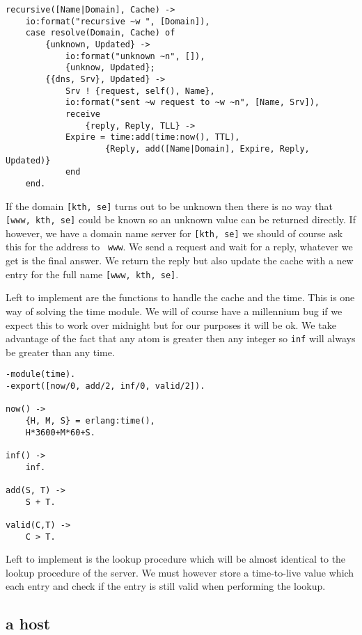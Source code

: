 \documentclass[a4paper, 11pt]{article}
\begin{document}
\begin{verbatim}
recursive([Name|Domain], Cache) ->
    io:format("recursive ~w ", [Domain]),
    case resolve(Domain, Cache) of    
        {unknown, Updated} ->
            io:format("unknown ~n", []),
            {unknow, Updated};
        {{dns, Srv}, Updated} ->
            Srv ! {request, self(), Name},
            io:format("sent ~w request to ~w ~n", [Name, Srv]),
            receive 
                {reply, Reply, TLL} ->
		    Expire = time:add(time:now(), TTL),
                    {Reply, add([Name|Domain], Expire, Reply, Updated)}
            end
    end.
\end{verbatim}

If the domain {\tt [kth, se]} turns out to be unknown then there is no
way that {\tt [www, kth, se]} could be known so an unknown value can
be returned directly. If however, we have a domain name server for
{\tt [kth, se]} we should of course ask this for the address to {\tt
www}. We send a request and wait for a reply, whatever we get is the
final answer. We return the reply but also update the cache with a new
entry for the full name {\tt [www, kth, se]}. 

Left to implement are the functions to handle the cache and the
time. This is one way of solving the time module. We will of course
have a millennium bug if we expect this to work over midnight but for
our purposes it will be ok. We take advantage of the fact that any
atom is greater then any integer so {\tt inf} will always be greater
than any time.


\begin{verbatim}
-module(time).
-export([now/0, add/2, inf/0, valid/2]).

now() ->
    {H, M, S} = erlang:time(),
    H*3600+M*60+S.

inf() ->
    inf.

add(S, T) ->
    S + T.
    
valid(C,T) ->
    C > T.
\end{verbatim}

Left to implement is the lookup procedure which will be almost
identical to the lookup procedure of the server. We must however store
a time-to-live value which each entry and check if the entry is still
valid when performing the lookup. 

\subsection{a host}
\end{document}
